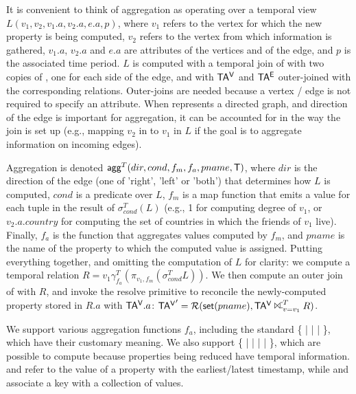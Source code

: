 It is convenient to think of aggregation as operating over a temporal
view $L(v_1,v_2,v_1.a,v_2.a,e.a,p)$, where $v_1$ refers to the vertex
for which the new property is being computed, $v_2$ refers to the
vertex from which information is gathered, $v_1.a$, $v_2.a$ and $e.a$
are attributes of the vertices and of the edge, and $p$ is the
associated time period.  $L$ is computed with a temporal join of \te
with two copies of \tv, one for each side of the edge, and with $\mathsf{TA^{V}}$
and $\mathsf{TA^{E}}$ outer-joined with the corresponding relations.  Outer-joins
are needed because a vertex / edge is not required to specify an
attribute.  When \tve represents a directed graph, and direction of
the edge is important for aggregation, it can be accounted for in the
way the join is set up (e.g., mapping $v_2$ in \te to $v_1$ in $L$ if
the goal is to aggregate information on incoming edges).

Aggregation is denoted $\textsf{agg}^T(dir,cond,f_m,f_a,pname,\mathsf{T})$,
where $dir$ is the direction of the edge (one of 'right', 'left' or
'both') that determines how $L$ is computed, $cond$ is a predicate
over $L$, $f_m$ is a map function that emits a value for each tuple in
the result of $\sigma^T_{cond}(L)$ (e.g., 1 for computing degree of
$v_1$, or $v_2.a.country$ for computing the set of countries in which
the friends of $v_1$ live).  Finally, $f_a$ is the function that
aggregates values computed by $f_m$, and $pname$ is the name of the
property to which the computed value is assigned.  Putting everything
together, and omitting the computation of $L$ for clarity: we compute
a temporal relation $R = v_1 \gamma^T_{f_a} (\pi_{v_1,f_m}
(\sigma^T_{cond} L))$.  We then compute an outer join of \tav with
$R$, and invoke the resolve primitive to reconcile the newly-computed
property stored in $R.a$ with $\mathsf{TA^{V}}.a$: $\tav' =
\resolve{\insql{set}(pname)}{\tav \rightouterjoin^T_{v=v_1} R}$.


We support various aggregation functions $f_a$, including the standard
\{  |  |  |  \}, which
have their customary meaning.  We also support \{  |
 |  |  |  \}, which
are possible to compute because properties being reduced have temporal
information.   and  refer to the value of a
property with the earliest/latest timestamp, while  and
 associate a key with a collection of values.

